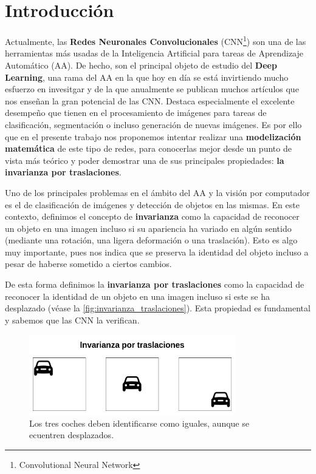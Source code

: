 

\chapter{Introducción}

\noindent Actualmente, las \textbf{Redes Neuronales Convolucionales} (CNN\footnote{Convolutional Neural Network}) son una de las herramientas más usadas de la Inteligencia Artificial para tareas de Aprendizaje Automático (AA). De hecho, son el principal objeto de estudio del \textbf{Deep Learning}, una rama del AA en la que hoy en día se está invirtiendo mucho esfuerzo en invesitgar y de la que anualmente se publican muchos artículos que nos enseñan la gran potencial de las CNN. Destaca especialmente el excelente desempeño que tienen en el procesamiento de imágenes para tareas de clasificación, segmentación o incluso generación de nuevas imágenes. Es por ello que en el presente trabajo nos proponemos intentar realizar una \textbf{modelización matemática} de este tipo de redes, para conocerlas mejor desde un punto de vista más teórico y poder demostrar una de sus principales propiedades: \textbf{la invarianza por traslaciones}.

\medskip

\noindent Uno de los principales problemas en el ámbito del AA y la visión por computador es el de clasificación de imágenes y detección de objetos en las mismas. En este contexto, definimos el concepto de \textbf{invarianza} como la capacidad de reconocer un objeto en una imagen incluso si su apariencia ha variado en algún sentido (mediante una rotación, una  ligera deformación o una traslación). Esto es algo muy importante, pues nos indica que se preserva la identidad del objeto incluso a pesar de haberse sometido a ciertos cambios.

\medskip

\noindent De esta forma definimos la \textbf{invarianza por traslaciones} como la capacidad de reconocer la identidad de un objeto en una imagen incluso si este se ha desplazado (véase la \autoref{fig:invarianza_traslaciones}). Esta propiedad es fundamental y sabemos que las CNN la verifican.

\begin{figure} [!h]
    \centering
    \includegraphics[width=0.8\textwidth]{img/translation_invariance.png}
    \caption{Los tres coches deben identificarse como iguales, aunque se ecuentren desplazados.}
    \label{fig:invarianza_traslaciones}
\end{figure}

